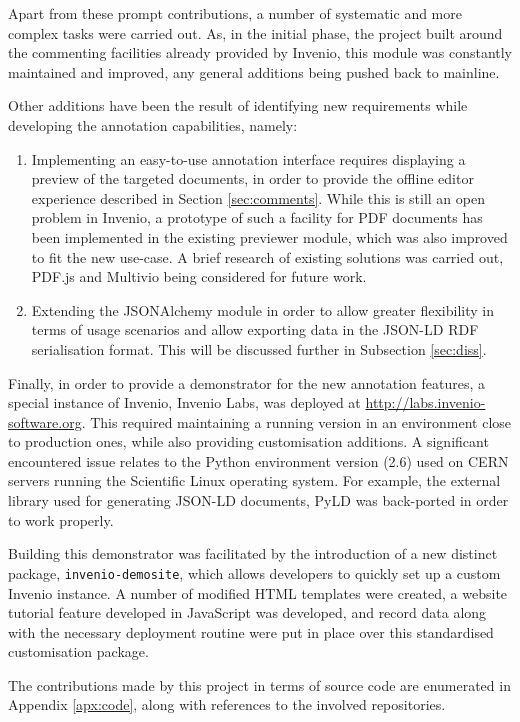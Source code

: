 Apart from these prompt contributions, a number of systematic and more
complex tasks were carried out. As, in the initial phase, the project built
around the commenting facilities already provided by Invenio, this module was
constantly maintained and improved, any general additions being pushed
back to mainline.

\newpage

Other additions have been the result of identifying new requirements while
developing the annotation capabilities, namely:
\begin{enumerate}
  \item Implementing an easy-to-use annotation interface requires displaying a
        preview of the targeted documents, in order to provide the offline
        editor experience described in Section \ref{sec:comments}. While this
        is still an open problem in Invenio, a prototype of such a facility for
        PDF documents has been implemented in the existing previewer module,
        which was also improved to fit the new use-case. A brief research of
        existing solutions was carried out, PDF.js \cite{ref:pdfjs} and Multivio
        \cite{ref:multivio} being considered for future work.
  \item Extending the JSONAlchemy module in order to allow greater
        flexibility in terms of usage scenarios and allow exporting data in
        the JSON-LD RDF serialisation format. This will be discussed further in
        Subsection \ref{sec:diss}.
\end{enumerate}

Finally, in order to provide a demonstrator for the new annotation features, a
special instance of Invenio, Invenio Labs, was deployed at
\url{http://labs.invenio-software.org}. This required maintaining a running
version in an environment close to production ones, while also providing
customisation additions. A significant encountered issue relates to the Python
environment version (2.6) used on CERN servers running the Scientific Linux
operating system. For example, the external library used for generating JSON-LD
documents, PyLD \cite{ref:pyld} was back-ported in order to work properly.

Building this demonstrator was facilitated by the introduction of a new
distinct package, \texttt{invenio-demosite}, which allows developers to quickly
set up a custom Invenio instance. A number of modified HTML templates were
created, a website tutorial feature developed in JavaScript was developed, and
record data along with the necessary deployment routine were put in
place over this standardised customisation package.

The contributions made by this project in terms of source code are
enumerated in Appendix \ref{apx:code}, along with references to the involved
repositories.
